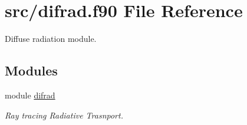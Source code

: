 \hypertarget{difrad_8f90}{}\section{src/difrad.f90 File Reference}
\label{difrad_8f90}


Diffuse radiation module.  


\subsection*{Modules}
\begin{DoxyCompactItemize}
\item 
module \hyperlink{namespacedifrad}{difrad}
\begin{DoxyCompactList}\small\item\em Ray tracing Radiative Trasnport. \end{DoxyCompactList}\end{DoxyCompactItemize}

